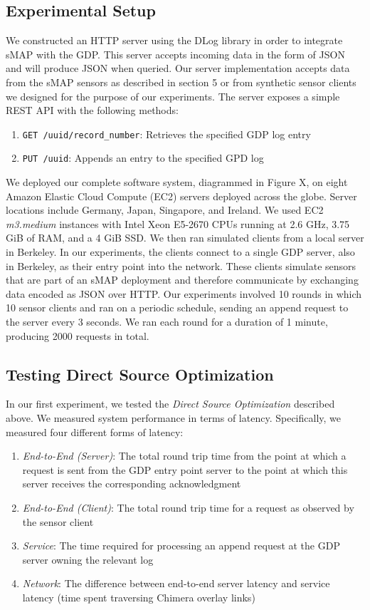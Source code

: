 \subsection{Experimental Setup}
We constructed an HTTP server using the DLog library in order to integrate sMAP with the GDP. This server accepts incoming data in the form of JSON and will produce JSON when queried. Our server implementation accepts data from the sMAP sensors as described in section 5 or from synthetic sensor clients we designed for the purpose of our experiments. The server exposes a simple REST API with the following methods:
\begin{enumerate}
\item \texttt{GET /uuid/record\_number}: Retrieves the specified GDP log entry
\item \texttt{PUT /uuid}: Appends an entry to the specified GPD log
\end{enumerate}

We deployed our complete software system, diagrammed in Figure X, on eight Amazon Elastic Cloud Compute (EC2) servers deployed across the globe. Server locations include Germany, Japan, Singapore, and Ireland. We used EC2 \textit{m3.medium} instances with Intel Xeon E5-2670 CPUs running at 2.6 GHz, 3.75 GiB of RAM, and a 4 GiB SSD. We then ran simulated clients from a local server in Berkeley. In our experiments, the clients connect to a single GDP server, also in Berkeley, as their entry point into the network. These clients simulate sensors that are part of an sMAP deployment and therefore communicate by exchanging data encoded as JSON over HTTP. Our experiments involved 10 rounds in which 10 sensor clients and ran on a periodic schedule, sending an append request to the server every 3 seconds. We ran each round for a duration of 1 minute, producing 2000 requests in total.

\subsection{Testing Direct Source Optimization}
In our first experiment, we tested the \textit{Direct Source Optimization} described above. We measured system performance in terms of latency. Specifically, we measured four different forms of latency:
\begin{enumerate}
\item \textit{End-to-End (Server)}: The total round trip time from the point at which a request is sent from the GDP entry point server to the point at which this server receives the corresponding acknowledgment
\item \textit{End-to-End (Client)}: The total round trip time for a request as observed by the sensor client
\item \textit{Service}: The time required for processing an append request at the GDP server owning the relevant log
\item \textit{Network}: The difference between end-to-end server latency and service latency (time spent traversing Chimera overlay links)
\end{enumerate}

